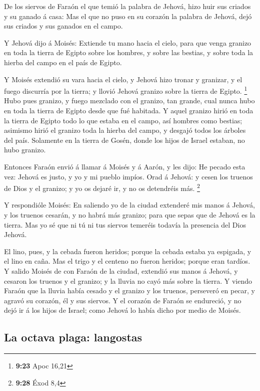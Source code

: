  De los siervos de Faraón el que temió la palabra de
Jehová, hizo huir sus criados y su ganado á casa:  Mas el
que no puso en su corazón la palabra de Jehová, dejó sus criados y sus
ganados en el campo.

 Y Jehová dijo á Moisés: Extiende tu mano hacia el cielo,
para que venga granizo en toda la tierra de Egipto sobre los hombres, y
sobre las bestias, y sobre toda la hierba del campo en el país de
Egipto.

 Y Moisés extendió su vara hacia el cielo, y Jehová hizo
tronar y granizar, y el fuego discurría por la tierra; y llovió Jehová
granizo sobre la tierra de Egipto. \footnote{\textbf{9:23} Apoc 16,21}
 Hubo pues granizo, y fuego mezclado con el granizo, tan
grande, cual nunca hubo en toda la tierra de Egipto desde que fué
habitada.  Y aquel granizo hirió en toda la tierra de
Egipto todo lo que estaba en el campo, así hombres como bestias;
asimismo hirió el granizo toda la hierba del campo, y desgajó todos los
árboles del país.  Solamente en la tierra de Gosén, donde
los hijos de Israel estaban, no hubo granizo.

 Entonces Faraón envió á llamar á Moisés y á Aarón, y les
dijo: He pecado esta vez: Jehová es justo, y yo y mi pueblo impíos.
 Orad á Jehová: y cesen los truenos de Dios y el granizo;
y yo os dejaré ir, y no os detendréis más. \footnote{\textbf{9:28} Éxod
  8,4}

 Y respondióle Moisés: En saliendo yo de la ciudad
extenderé mis manos á Jehová, y los truenos cesarán, y no habrá más
granizo; para que sepas que de Jehová es la tierra.  Mas
yo sé que ni tú ni tus siervos temeréis todavía la presencia del Dios
Jehová.

 El lino, pues, y la cebada fueron heridos; porque la
cebada estaba ya espigada, y el lino en caña.  Mas el
trigo y el centeno no fueron heridos; porque eran tardíos.
 Y salido Moisés de con Faraón de la ciudad, extendió sus
manos á Jehová, y cesaron los truenos y el granizo; y la lluvia no cayó
más sobre la tierra.  Y viendo Faraón que la lluvia había
cesado y el granizo y los truenos, perseveró en pecar, y agravó su
corazón, él y sus siervos.  Y el corazón de Faraón se
endureció, y no dejó ir á los hijos de Israel; como Jehová lo había
dicho por medio de Moisés.

\hypertarget{la-octava-plaga-langostas}{%
\subsection{La octava plaga:
langostas}\label{la-octava-plaga-langostas}}

